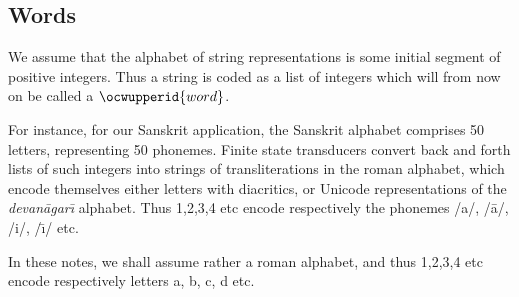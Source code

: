 \subsection{Words}

We assume that the alphabet of string representations is
some initial segment of positive integers. Thus a string is coded as
a list of integers which will from now on be called a 
\ocwbegincode{}$\ocwupperid{word}$\ocwendcode{}. %

For instance, for our Sanskrit application, the Sanskrit alphabet 
comprises 50 letters, representing 50 phonemes. Finite state transducers 
convert back and forth lists of such integers into strings of 
transliterations in the roman alphabet, which encode themselves either
letters with diacritics, or Unicode representations of the 
{\sl devan\=agar{\=\i}} alphabet. Thus 1,2,3,4 etc encode respectively
the phonemes /a/, /\=a/, /i/, /{\=\i}/ etc. 

In these notes, we shall assume rather a roman alphabet, and thus 1,2,3,4 etc 
encode respectively letters a, b, c, d etc. 

